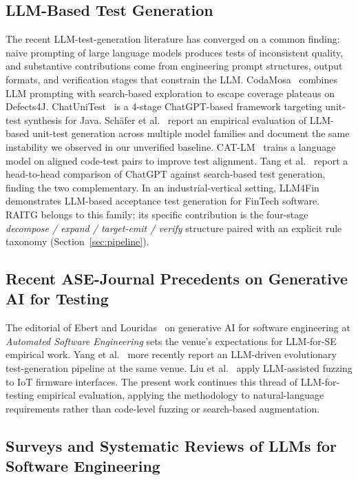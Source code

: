 \documentclass[10pt,twocolumn,letterpaper]{article}
\begin{document}
\subsection{LLM-Based Test Generation}

The recent LLM-test-generation literature has converged on a common
finding: naive prompting of large language models produces tests of
inconsistent quality, and substantive contributions come from
engineering prompt structures, output formats, and verification
stages that constrain the LLM. CodaMosa~\citep{lemieux2023codamosa}
combines LLM prompting with search-based exploration to escape
coverage plateaus on Defects4J. ChatUniTest~\citep{yuan2024chatunitest}
is a 4-stage ChatGPT-based framework targeting unit-test synthesis
for Java. Sch{\"a}fer et al.~\citep{schafer2024empirical} report an
empirical evaluation of LLM-based unit-test generation across
multiple model families and document the same instability we
observed in our unverified baseline. CAT-LM~\citep{rao2023catlm}
trains a language model on aligned code-test pairs to improve test
alignment. Tang et al.~\citep{tang2024chatgptsbst} report a
head-to-head comparison of ChatGPT against search-based test
generation, finding the two complementary. In an industrial-vertical
setting, LLM4Fin~\citep{cheng2024llm4fin} demonstrates LLM-based
acceptance test generation for FinTech software. RAITG belongs to
this family; its specific contribution is the four-stage
\emph{decompose / expand / target-emit / verify} structure paired
with an explicit rule taxonomy (Section~\ref{sec:pipeline}).

\subsection{Recent ASE-Journal Precedents on Generative AI for Testing}

The editorial of Ebert and Louridas~\citep{ebert2024genai} on
generative AI for software engineering at \emph{Automated Software
Engineering} sets the venue's expectations for LLM-for-SE empirical
work. Yang et al.~\citep{yang2025llmevotest} more recently report an
LLM-driven evolutionary test-generation pipeline at the same venue.
Liu et al.~\citep{liu2025iotfuzz} apply LLM-assisted fuzzing to IoT
firmware interfaces. The present work continues this thread of
LLM-for-testing empirical evaluation, applying the methodology to
natural-language requirements rather than code-level fuzzing or
search-based augmentation.

\subsection{Surveys and Systematic Reviews of LLMs for Software Engineering}
\end{document}
